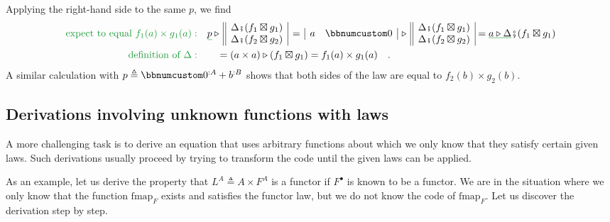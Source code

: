 Applying the right-hand side to the same $p$, we find
\begin{align*}
{\color{greenunder}\text{expect to equal }f_{1}(a)\times g_{1}(a):}\quad & \gunderline p\triangleright\,\begin{array}{||c|}
\Delta\bef(f_{1}\boxtimes g_{1})\\
\Delta\bef(f_{2}\boxtimes g_{2})
\end{array}\,=\,\begin{array}{|cc|}
a & \bbnum 0\end{array}\,\triangleright\,\begin{array}{||c|}
\Delta\bef(f_{1}\boxtimes g_{1})\\
\Delta\bef(f_{2}\boxtimes g_{2})
\end{array}=\gunderline{a\triangleright\Delta}\bef(f_{1}\boxtimes g_{1})\\
{\color{greenunder}\text{definition of }\Delta:}\quad & \quad=(a\times a)\triangleright(f_{1}\boxtimes g_{1})=f_{1}(a)\times g_{1}(a)\quad.
\end{align*}
A similar calculation with $p\triangleq\bbnum 0^{:A}+b^{:B}$ shows
that both sides of the law are equal to $f_{2}(b)\times g_{2}(b)$.

\subsection{Derivations involving unknown functions with laws}

A more challenging task is to derive an equation that uses arbitrary
functions about which we only know that they satisfy certain given
laws. Such derivations usually proceed by trying to transform the
code until the given laws can be applied.

As an example, let us derive the property that $L^{A}\triangleq A\times F^{A}$
is a functor if $F^{\bullet}$ is known to be a functor. We are in
the situation where we only know that the function $\text{fmap}_{F}$
exists and satisfies the functor law, but we do not know the code
of $\text{fmap}_{F}$. Let us discover the derivation step by step.

